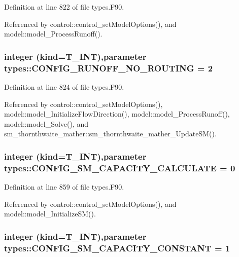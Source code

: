 Definition at line 822 of file types.F90.



Referenced by control::control\_\-setModelOptions(), and model::model\_\-ProcessRunoff().

\hypertarget{namespacetypes_a322478702adcb70451718ef549d9071b}{
\subsubsection[{CONFIG\_\-RUNOFF\_\-NO\_\-ROUTING}]{\setlength{\rightskip}{0pt plus 5cm}integer (kind={\bf T\_\-INT}),parameter {\bf types::CONFIG\_\-RUNOFF\_\-NO\_\-ROUTING} = 2}}
\label{namespacetypes_a322478702adcb70451718ef549d9071b}


Definition at line 824 of file types.F90.



Referenced by control::control\_\-setModelOptions(), model::model\_\-InitializeFlowDirection(), model::model\_\-ProcessRunoff(), model::model\_\-Solve(), and sm\_\-thornthwaite\_\-mather::sm\_\-thornthwaite\_\-mather\_\-UpdateSM().

\hypertarget{namespacetypes_a67150551220cbe5b199d578709e71d15}{
\subsubsection[{CONFIG\_\-SM\_\-CAPACITY\_\-CALCULATE}]{\setlength{\rightskip}{0pt plus 5cm}integer (kind={\bf T\_\-INT}),parameter {\bf types::CONFIG\_\-SM\_\-CAPACITY\_\-CALCULATE} = 0}}
\label{namespacetypes_a67150551220cbe5b199d578709e71d15}


Definition at line 859 of file types.F90.



Referenced by control::control\_\-setModelOptions(), and model::model\_\-InitializeSM().

\hypertarget{namespacetypes_a36ff9b99df167660591ebadeffa4cf54}{
\subsubsection[{CONFIG\_\-SM\_\-CAPACITY\_\-CONSTANT}]{\setlength{\rightskip}{0pt plus 5cm}integer (kind={\bf T\_\-INT}),parameter {\bf types::CONFIG\_\-SM\_\-CAPACITY\_\-CONSTANT} = 1}}
\label{namespacetypes_a36ff9b99df167660591ebadeffa4cf54}


